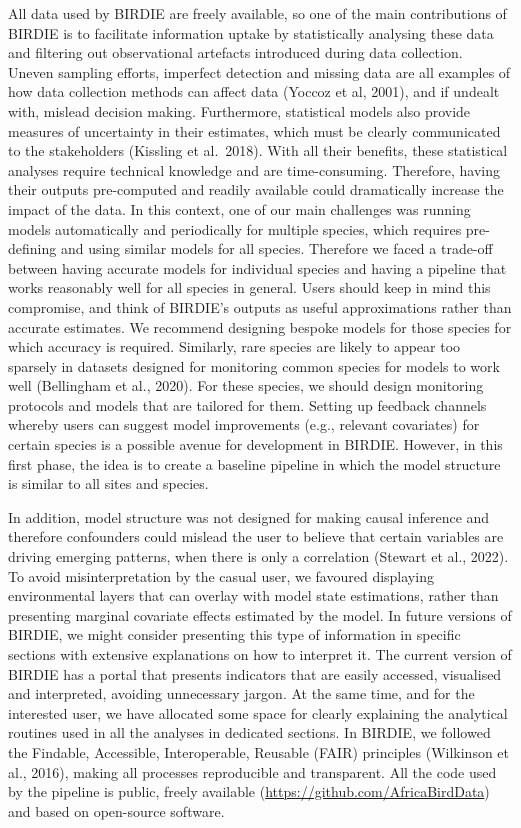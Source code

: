 \documentclass[utf8]{frontiersSCNS}
\begin{document}
All data used by BIRDIE are freely available, so one of the main
contributions of BIRDIE is to facilitate information uptake by
statistically analysing these data and filtering out observational
artefacts introduced during data collection. Uneven sampling efforts,
imperfect detection and missing data are all examples of how data
collection methods can affect data (Yoccoz et al, 2001), and if undealt
with, mislead decision making. Furthermore, statistical models also
provide measures of uncertainty in their estimates, which must be
clearly communicated to the stakeholders (Kissling et al.~2018). With
all their benefits, these statistical analyses require technical
knowledge and are time-consuming. Therefore, having their outputs
pre-computed and readily available could dramatically increase the
impact of the data. In this context, one of our main challenges was
running models automatically and periodically for multiple species,
which requires pre-defining and using similar models for all species.
Therefore we faced a trade-off between having accurate models for
individual species and having a pipeline that works reasonably well for
all species in general. Users should keep in mind this compromise, and
think of BIRDIE's outputs as useful approximations rather than accurate
estimates. We recommend designing bespoke models for those species for
which accuracy is required. Similarly, rare species are likely to appear
too sparsely in datasets designed for monitoring common species for
models to work well (Bellingham et al., 2020). For these species, we
should design monitoring protocols and models that are tailored for
them. Setting up feedback channels whereby users can suggest model
improvements (e.g., relevant covariates) for certain species is a
possible avenue for development in BIRDIE. However, in this first phase,
the idea is to create a baseline pipeline in which the model structure
is similar to all sites and species.

In addition, model structure was not designed for making causal
inference and therefore confounders could mislead the user to believe
that certain variables are driving emerging patterns, when there is only
a correlation (Stewart et al., 2022). To avoid misinterpretation by the
casual user, we favoured displaying environmental layers that can
overlay with model state estimations, rather than presenting marginal
covariate effects estimated by the model. In future versions of BIRDIE,
we might consider presenting this type of information in specific
sections with extensive explanations on how to interpret it. The current
version of BIRDIE has a portal that presents indicators that are easily
accessed, visualised and interpreted, avoiding unnecessary jargon. At
the same time, and for the interested user, we have allocated some space
for clearly explaining the analytical routines used in all the analyses
in dedicated sections. In BIRDIE, we followed the Findable, Accessible,
Interoperable, Reusable (FAIR) principles (Wilkinson et al., 2016),
making all processes reproducible and transparent. All the code used by
the pipeline is public, freely available
(\url{https://github.com/AfricaBirdData}) and based on open-source
software.
\end{document}
